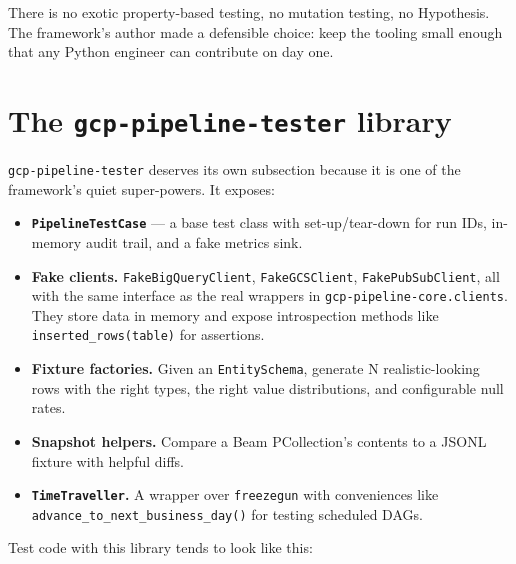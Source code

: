 \documentclass[
  11pt,
  british,
  oneside]{book}
\providecommand{\tightlist}{%
  \setlength{\itemsep}{0pt}\setlength{\parskip}{0pt}}
\begin{document}
There is no exotic property-based testing, no mutation testing, no
Hypothesis. The framework's author made a defensible choice: keep the
tooling small enough that any Python engineer can contribute on day one.

\hypertarget{the-gcp-pipeline-tester-library}{%
\section{\texorpdfstring{The \texttt{gcp-pipeline-tester}
library}{The gcp-pipeline-tester library}}\label{the-gcp-pipeline-tester-library}}

\texttt{gcp-pipeline-tester} deserves its own
subsection because it is one of the framework's quiet super-powers. It
exposes:

\begin{itemize}
\tightlist
\item
  \textbf{\texttt{PipelineTestCase}} --- a base test class with
  set-up/tear-down for run IDs, in-memory audit trail, and a fake
  metrics sink.
\item
  \textbf{Fake clients.} \texttt{FakeBigQueryClient},
  \texttt{FakeGCSClient}, \texttt{FakePubSubClient}, all with the same
  interface as the real wrappers in \texttt{gcp-pipeline-core.clients}.
  They store data in memory and expose introspection methods like
  \texttt{inserted\_rows(table)} for assertions.
\item
  \textbf{Fixture factories.} Given an \texttt{EntitySchema}, generate N
  realistic-looking rows with the right types, the right value
  distributions, and configurable null rates.
\item
  \textbf{Snapshot helpers.} Compare a Beam PCollection's contents to a
  JSONL fixture with helpful diffs.
\item
  \textbf{\texttt{TimeTraveller}.} A wrapper over \texttt{freezegun}
  with conveniences like \texttt{advance\_to\_next\_business\_day()} for
  testing scheduled DAGs.
\end{itemize}

Test code with this library tends to look like this:
\end{document}
